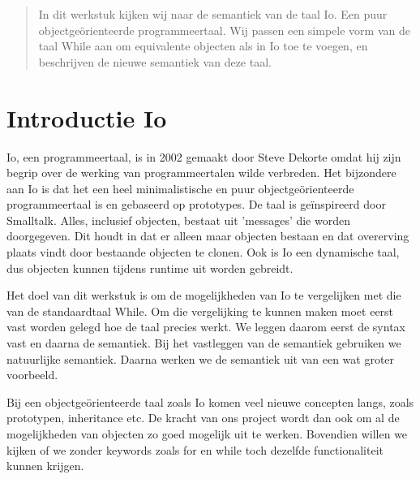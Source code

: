 \documentclass[12pt]{article}
\begin{document}
\maketitle

\begin{abstract}
In dit werkstuk kijken wij naar de semantiek van de taal Io. Een puur objectge\"orienteerde programmeertaal. Wij passen een simpele vorm van de taal While aan om equivalente objecten als in Io toe te voegen, en beschrijven de nieuwe semantiek van deze taal.
\end{abstract}

\section{Introductie Io}
Io, een programmeertaal, is in 2002 gemaakt door Steve Dekorte omdat hij zijn begrip over de werking van programmeertalen wilde verbreden.
Het bijzondere aan Io is dat het een heel minimalistische en puur objectge\"orienteerde programmeertaal is en gebaseerd op prototypes. De taal is ge\"inspireerd door Smalltalk. Alles, inclusief objecten, bestaat uit 'messages' die worden doorgegeven.
Dit houdt in dat er alleen maar objecten bestaan en dat overerving plaats vindt door bestaande objecten te clonen.
Ook is Io een dynamische taal, dus objecten kunnen tijdens runtime uit worden gebreidt.

Het doel van dit werkstuk is om de mogelijkheden van Io te vergelijken met die van de standaardtaal While.
Om die vergelijking te kunnen maken moet eerst vast worden gelegd hoe de taal precies werkt.
We leggen daarom eerst de syntax vast en daarna de semantiek. Bij het vastleggen van de semantiek gebruiken we natuurlijke semantiek.
Daarna werken we de semantiek uit van een wat groter voorbeeld.

Bij een objectge\"orienteerde taal zoals Io komen veel nieuwe concepten langs, zoals prototypen, inheritance etc. De kracht van ons project wordt dan ook om al de mogelijkheden van objecten 
zo goed mogelijk uit te werken.  Bovendien willen we kijken of we zonder keywords zoals for en while toch dezelfde functionaliteit kunnen krijgen.
\end{document}
